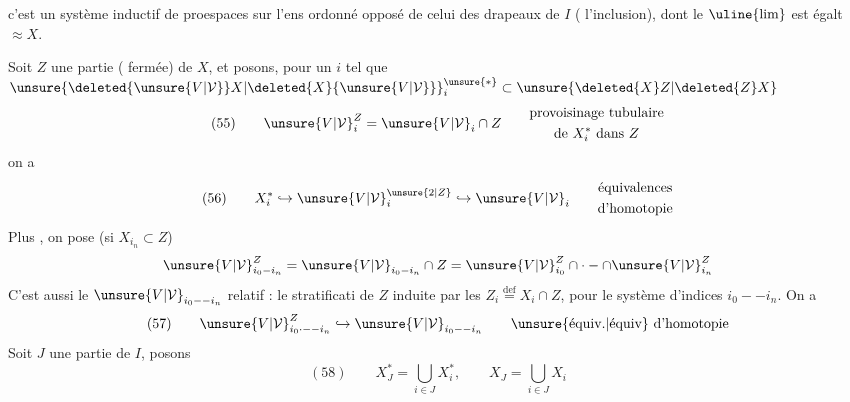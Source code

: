 c'est un système inductif de  proespaces
sur l'ens ordonné opposé de celui des drapeaux de $I$
( l'inclusion), dont le $\uline{\lim}$ est égalt $\approx X$.

Soit $Z$  une partie ( fermée)
de $X$, et posons, pour \deleted{$\unsure{\forall}$} un $i$ tel que
${\unsure{\deleted{{\unsure{V|\mathcal V}}}X|\deleted{X}{\unsure{V|\mathcal V}}}}_i^{\unsure{*}}
\subset\unsure{\deleted{X}Z|\deleted{Z}X}$
\[
(55)\qquad {\unsure{V|\mathcal V}}_i^Z
={\unsure{V|\mathcal V}}_i\cap Z\qquad
\begin{gathered}
\text{provoisinage tubulaire}\\
\text{de }X_i^*\text{ dans }Z
\end{gathered}
\]
on a
\[
(56)\qquad X_i^*\hookrightarrow
{\unsure{V|\mathcal V}}_i^{\unsure{2|Z}}\hookrightarrow{\unsure{V|\mathcal V}}_i
\qquad\begin{gathered}
\text{équivalences}\\
\text{d'homotopie}
\end{gathered}
\]
Plus , on pose (si $X_{i_n}\subset Z$)
\[
{\unsure{V|\mathcal V}}_{i_0-i_n}^Z
={\unsure{V|\mathcal V}}_{i_0-i_n}\cap Z
={\unsure{V|\mathcal V}}_{i_0}^Z\cap\cdot-\cap{\unsure{V|\mathcal V}}_{i_n}^Z
\]
C'est aussi le ${\unsure{V|\mathcal V}}_{i_0--i_n}$ relatif : le 
stratificati\unsure{-}
de $Z$ induite par les
$Z_i\overset{\mathrm{def}}{=}X_i\cap Z$, pour le système d'indices
$i_0--i_n$. On a
\[
(57)\qquad {\unsure{V|\mathcal V}}_{i_0\cdot--i_n}^Z
\hookrightarrow{\unsure{V|\mathcal V}}_{i_0--i_n}
\qquad\text{\unsure{équiv.|équiv} d'homotopie}
\]
Soit $J$ une partie de $I$, posons
\[
(58)\qquad X_J^*=\bigcup_{i\in J}X_i^*,\qquad X_J=\bigcup_{i\in J}X_i
\]
